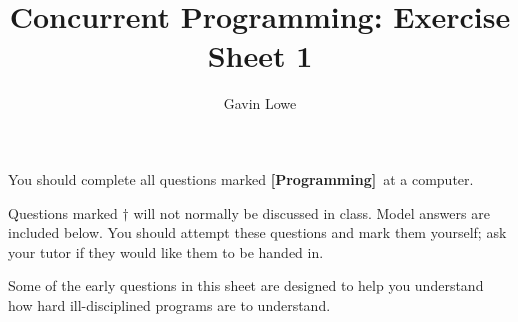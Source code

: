 \documentclass[fleqn,12pt]{article}
\title{Concurrent Programming: Exercise Sheet 1}
\author{Gavin Lowe}
\def\Programming{\textbf{[Programming]}}
\begin{document}
\maketitle

You should complete all questions marked \Programming\ at a computer.

Questions marked $\dagger$ will not normally be discussed in class.  Model
answers are included below.  You should attempt these questions and mark them
yourself; ask your tutor if they would like them to be handed in.

Some of the early questions in this sheet are designed to help you understand
how hard ill-disciplined programs are to understand.  



\end{document}
